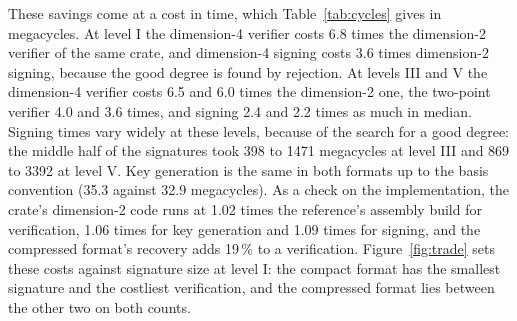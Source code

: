 \documentclass[version=preprint]{iacrcc}
\begin{document}
    These savings come at a cost in time, which Table~\ref{tab:cycles} gives in
    megacycles. At level I the dimension-4 verifier costs 6.8 times the
    dimension-2 verifier of the same crate, and dimension-4 signing costs 3.6
    times dimension-2 signing, because the good degree is found by rejection. At levels III and V the dimension-4 verifier costs 6.5 and 6.0
    times the dimension-2 one, the two-point verifier 4.0 and 3.6 times, and
    signing 2.4 and 2.2 times as much in median. Signing times vary widely at
    these levels, because of the search for a good degree: the middle half of
    the signatures took 398 to 1471 megacycles at level III and 869 to 3392 at
    level V.
    Key generation is the same in both formats up to the basis convention
    (35.3 against 32.9 megacycles). As a check on the implementation, the
    crate's dimension-2 code runs at 1.02 times the reference's assembly build
    for verification, 1.06 times for key generation and 1.09 times for
    signing, and the compressed format's recovery adds 19\,\% to a
    verification. Figure~\ref{fig:trade} sets these costs against signature
    size at level I: the compact format has the smallest signature and the
    costliest verification, and the compressed format lies between the other
    two on both counts.
\end{document}
